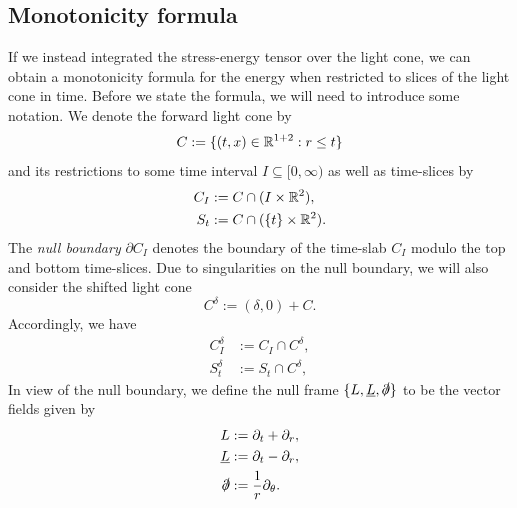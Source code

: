 \subsection{Monotonicity formula}

If we instead integrated the stress-energy tensor over the light cone, we can obtain a monotonicity formula for the energy when restricted to slices of the light cone in time. Before we state the formula, we will need to introduce some notation. We denote the forward light cone by 
	\[ C := \{(t,x ) \in \mathbb R^{1 + 2} : r \leq t\} \]
and its restrictions to some time interval $I \subseteq [0, \infty)$ as well as time-slices by 
	\begin{align*}
		C_I 
			&:= C \cap (I \times \mathbb R^2), \\
		S_{t}
			&:= C \cap (\{t\} \times \mathbb R^2).
	\end{align*}
The \emph{null boundary} $\partial C_I$ denotes the boundary of the time-slab $C_I$ modulo the top and bottom time-slices. Due to singularities on the null boundary, we will also consider the shifted light cone 
	\[ C^\delta := (\delta, 0) + C. \]
Accordingly, we have 
	\begin{align*}
		C^\delta_I
			&:= C_I \cap C^\delta, \\
		S^\delta_t
			&:= S_t \cap C^\delta,		
	\end{align*}	
In view of the null boundary, we define the null frame $\{L, \underline L, \slashed\partial\}$ to be the vector fields given by 
	\begin{align*}
		L
			&:= \partial_t + \partial_r, \\
		\underline L
			&:= \partial_t - \partial_r,\\
		\slashed \partial
			&:= \frac1r \partial_\theta . 		
	\end{align*}
	
